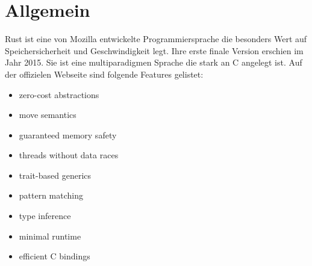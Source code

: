 \section{Allgemein}
Rust ist eine von Mozilla entwickelte Programmiersprache die besonders Wert auf Speichersicherheit und Geschwindigkeit legt. Ihre erste finale Version erschien im Jahr 2015.
Sie ist eine multiparadigmen Sprache die stark an C angelegt ist.
Auf der offizielen Webseite sind folgende Features gelistet:

\begin{itemize}	
\item zero-cost abstractions
\item move semantics
\item guaranteed memory safety
\item threads without data races
\item trait-based generics
\item pattern matching
\item type inference
\item minimal runtime
\item efficient C bindings
\end{itemize}






